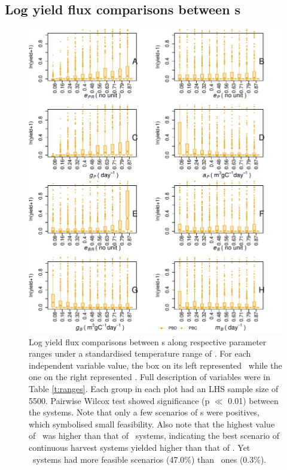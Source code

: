 \documentclass[../thesis.tex]{subfiles} %
\begin{document}
\subsection{Log yield flux comparisons between \pbs s}
\begin{figure}[H]
    \centering
    \includegraphics[width=\linewidth]{result/harvB.pdf}
    \caption[Log yield flux comparisons between \pbs s]{Log yield flux comparisons between \pbs s along respective parameter ranges under a standardised temperature range of \temp.  For each independent variable value, the box on its left represented \PBN\ while the one on the right represented \PBH.  Full description of variables were in Table \ref{t:ranges}.  Each group in each plot had an LHS sample size of 5500.  Pairwise Wilcox test showed significance (p $\ll$ 0.01) between the systems.  Note that only a few scenarios of \pbs s were positives, which symbolised small feasibility.  Also note that the highest value of \PBH\ was higher than that of \PBN\ systems, indicating the best scenario of continuous harvest systems yielded higher than that of \PBN.  Yet \PBN\ systems had more feasible scenarios (47.0\%) than \PBH\ ones (0.3\%).}
    \label{f:harvPB}
\end{figure}
\end{document}

